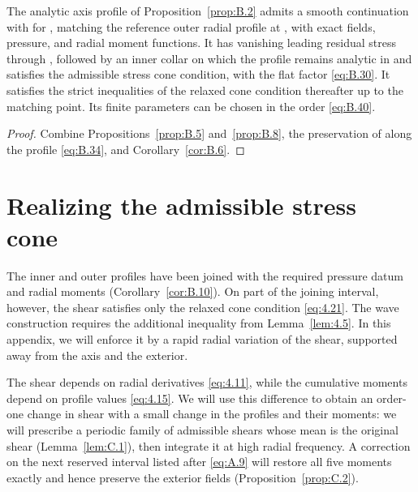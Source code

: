 \begin{corollary}\label{cor:B.10}
The analytic axis profile of Proposition~\ref{prop:B.2} admits a smooth continuation with
 for , matching the reference outer radial profile at
, with exact fields,
pressure, and radial moment functions. It has vanishing leading residual stress through
, followed
by an inner collar on which the profile remains analytic in  and satisfies the admissible stress cone
condition, with the flat factor \eqref{eq:B.30}. It satisfies the strict inequalities of the relaxed cone condition
thereafter up to the matching point. Its finite parameters can be chosen in the order \eqref{eq:B.40}.
\end{corollary}

\begin{proof}
Combine Propositions~\ref{prop:B.5} and~\ref{prop:B.8}, the preservation of
 along the profile \eqref{eq:B.34},
and Corollary~\ref{cor:B.6}.
\end{proof}

\section{Realizing the admissible stress cone}\label{sec:C}

The inner and outer profiles  have been joined with the required pressure datum
and radial moments (Corollary~\ref{cor:B.10}). On part of the joining interval, however, the shear
%
 satisfies only the relaxed cone condition \eqref{eq:4.21}. The wave construction requires the
additional inequality  from Lemma~\ref{lem:4.5}. In this appendix, we will enforce it by a rapid
radial variation of the shear, supported away from the axis and the exterior.

The shear depends on radial derivatives \eqref{eq:4.11}, while the cumulative moments
 depend on profile values \eqref{eq:4.15}. We will use this difference to obtain an
order-one change in shear with a small change in the profiles and their moments: we will
prescribe a periodic family of admissible shears  whose mean is the original shear
(Lemma~\ref{lem:C.1}), then integrate it at high radial frequency. A correction on the next reserved
interval listed after \eqref{eq:A.9} will restore all five moments exactly and hence preserve the exterior
fields (Proposition~\ref{prop:C.2}).

